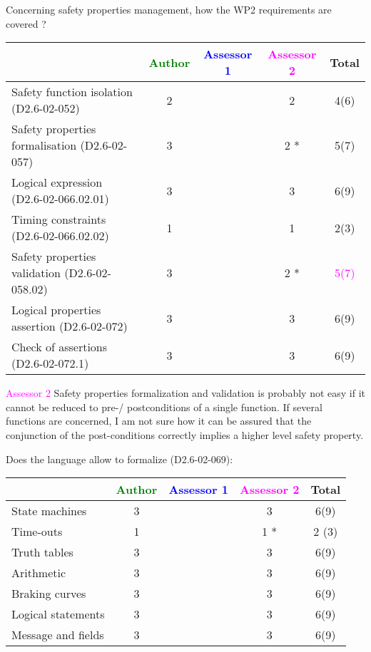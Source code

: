 Concerning safety properties management, how the WP2 requirements are covered ?

\begin{tabular}{|l | c | c | c | c|}
\hline
& \textcolor{green}{Author} & \textcolor{blue}{Assessor 1} & \textcolor{magenta}{Assessor 2} & Total \\
\hline 
Safety function isolation (D2.6-02-052)  & 2     & & 2     &  4(6) \\
\hline 
Safety properties formalisation (D2.6-02-057)  & 3     & & 2    * &  5(7) \\
\hline
Logical expression (D2.6-02-066.02.01)  & 3     & & 3     &  6(9) \\
\hline
Timing constraints (D2.6-02-066.02.02)  & 1     & & 1     &  2(3) \\
\hline
Safety properties validation (D2.6-02-058.02)  & 3     & & 2    * & \textcolor{magenta}{5(7)}  \\
\hline
Logical properties assertion (D2.6-02-072)  & 3     & & 3     &  6(9) \\
\hline
Check  of assertions (D2.6-02-072.1)  & 3     & & 3     &  6(9) \\
\hline
\end{tabular}

\textcolor{magenta}{Assessor 2} Safety properties formalization and validation
is probably not easy if it cannot be reduced to pre-/ postconditions of a single
function. If several functions are concerned, I am not sure how it can be
assured that the conjunction of the post-conditions correctly implies a higher
level safety property.

Does the language allow to  formalize (D2.6-02-069):

\begin{tabular}{|l | c | c | c | c|}
\hline
& \textcolor{green}{Author} & \textcolor{blue}{Assessor 1} & \textcolor{magenta}{Assessor 2} & Total \\
\hline 
State machines  & 3     & & 3     &  6(9) \\
\hline
Time-outs  & 1     & & 1    * & 2 (3)  \\
\hline
Truth tables  & 3     & & 3     &  6(9) \\
\hline
Arithmetic  & 3     & & 3     &  6(9) \\
\hline
Braking curves  & 3     & & 3     &  6(9) \\
\hline
Logical statements & 3     & & 3     &  6(9) \\
\hline
Message and fields & 3     & & 3     &  6(9) \\
\hline
\end{tabular}

